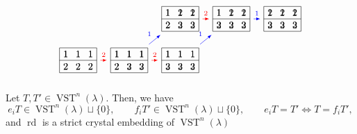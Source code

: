 \documentclass[ALCO,ThmDefs,Unicode,epreuves]{cedram}
\DeclareMathOperator{\rd}{rd} %
\DeclareMathOperator{\vst}{VST} %
\begin{document}
\begin{exam}
\[\begin{tikzpicture}[>=latex,xscale=1.85,yscale=1.5]
\node (hw) at (0,0) { $\tab{
  \foreach \x in {2,3} {
    \draw (\x-0.5, -0.5) node {$1$};
    \draw (\x-0.5, -1.5) node {$2$};
  }
  \draw (0.5,-0.5) node {$1$};
  \draw (0.5,-1.5) node {$2$};
} $};
\node (f2) at (1,0) { $\tab{
  \foreach \x in {2,3} {
    \draw (\x-0.5, -0.5) node {$1$};
    \draw (\x-0.5, -1.5) node {$3$};
  }
  \draw (0.5,-0.5) node {$1$};
  \draw (0.5,-1.5) node {$2$};
} $};
\node (f22) at (2,0) { $\tab{
  \foreach \x in {2,3} {
    \draw (\x-0.5, -0.5) node {$1$};
    \draw (\x-0.5, -1.5) node {$3$};
  }
  \draw (0.5,-0.5) node {$1$};
  \draw (0.5,-1.5) node {$3$};
} $};
\node (f12) at (2,1) { $\tab{
  \foreach \x in {2,3} {
    \draw (\x-0.5, -0.5) node {$2$};
    \draw (\x-0.5, -1.5) node {$3$};
  }
  \draw (0.5,-0.5) node {$1$};
  \draw (0.5,-1.5) node {$2$};
} $};
\node (f122) at (3,1) { $\tab{
  \foreach \x in {2,3} {
    \draw (\x-0.5, -0.5) node {$2$};
    \draw (\x-0.5, -1.5) node {$3$};
  }
  \draw (0.5,-0.5) node {$1$};
  \draw (0.5,-1.5) node {$3$};
} $};
\node (f1122) at (4,1) { $\tab{
  \foreach \x in {2,3} {
    \draw (\x-0.5, -0.5) node {$2$};
    \draw (\x-0.5, -1.5) node {$3$};
  }
  \draw (0.5,-0.5) node {$2$};
  \draw (0.5,-1.5) node {$3$};
} $};
\draw[->,red] (hw) -- node[midway,above] {\scriptsize 2} (f2);
\draw[->,red] (f2) -- node[midway,above] {\scriptsize 2} (f22);
\draw[->,blue] (f2) -- node[midway,above left] {\scriptsize 1} (f12);
\draw[->,red] (f12) -- node[midway,above] {\scriptsize 2} (f122);
\draw[->,blue] (f22) -- node[midway,above left] {\scriptsize 1} (f122);
\draw[->,blue] (f122) -- node[midway,above] {\scriptsize 1} (f1122);
\end{tikzpicture}
\]
\end{exam}

\begin{lemma}
\label{lemma:crystal_structure_vst}
Let $T, T' \in \vst^n(\lambda)$. Then, we have
\[
e_i T \in \vst^n(\lambda) \sqcup \{0\},
\qquad
f_i T' \in \vst^n(\lambda) \sqcup \{0\},
\qquad
e_i T = T' \Longleftrightarrow T = f_i T',
\]
and $\rd$ is a strict crystal embedding of $\vst^n(\lambda)$
\end{lemma}
\end{document}
